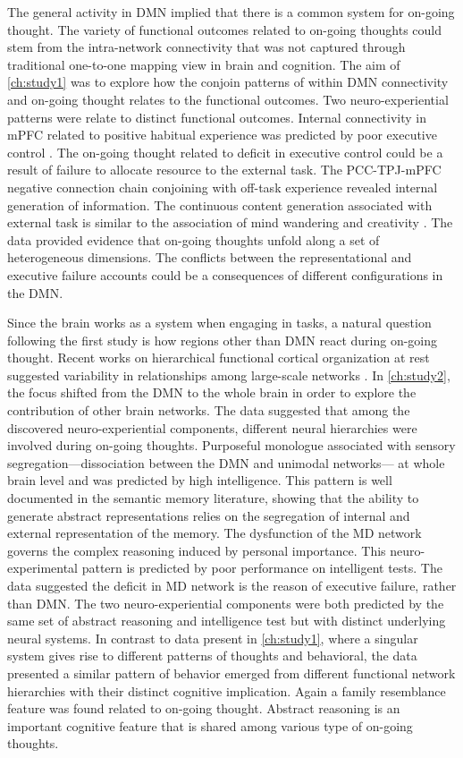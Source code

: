 The general activity in DMN implied that there is a common system for on-going thought. The variety of functional outcomes related to on-going thoughts could stem from the intra-network connectivity that was not captured through traditional one-to-one mapping view in brain and cognition. The aim of \cref{ch:study1} was to explore how the conjoin patterns of within DMN connectivity and on-going thought relates to the functional outcomes. Two neuro-experiential patterns were relate to distinct functional outcomes. Internal connectivity in mPFC related to positive habitual experience was predicted by poor executive control \cite{McVay2009}. The on-going thought related to deficit in executive control could be a result of failure to allocate resource to the external task. The PCC-TPJ-mPFC negative connection chain conjoining with off-task experience revealed internal generation of information. The continuous content generation associated with external task is similar to the association of mind wandering and creativity \cite{Baird2012}. The data provided evidence that on-going thoughts unfold along a set of heterogeneous dimensions. The conflicts between the representational and executive failure accounts could be a consequences of different configurations in the DMN. 

Since the brain works as a system when engaging in tasks, a natural question following the first study is how regions other than DMN react during on-going thought. Recent works on hierarchical functional cortical organization at rest suggested variability in relationships among large-scale networks \cite{Margulies2016}. In \cref{ch:study2}, the focus shifted from the DMN to the whole brain in order to explore the contribution of other brain networks. The data suggested that among the discovered neuro-experiential components, different neural hierarchies were involved during on-going thoughts. Purposeful monologue associated with sensory segregation---dissociation between the DMN and unimodal networks--- at whole brain level and was predicted by high intelligence. This pattern is well documented in the semantic memory literature, showing that the ability to generate abstract representations relies on the segregation of internal and external representation of the memory\cite{Murphy2018}. The dysfunction of the MD network \cite{Duncan2010} governs the complex reasoning induced by personal importance. This neuro-experimental pattern is predicted by poor performance on intelligent tests. The data suggested the deficit in MD network is the reason of executive failure, rather than DMN. The two neuro-experiential components were both predicted by the same set of abstract reasoning and intelligence test but with distinct underlying neural systems. In contrast to data present in \cref{ch:study1}, where a singular system gives rise to different patterns of thoughts and behavioral, the data presented a similar pattern of behavior emerged from different functional network hierarchies with their distinct cognitive implication. Again a family resemblance feature was found related to on-going thought. Abstract reasoning is an important cognitive feature that is shared among various type of on-going thoughts. 

